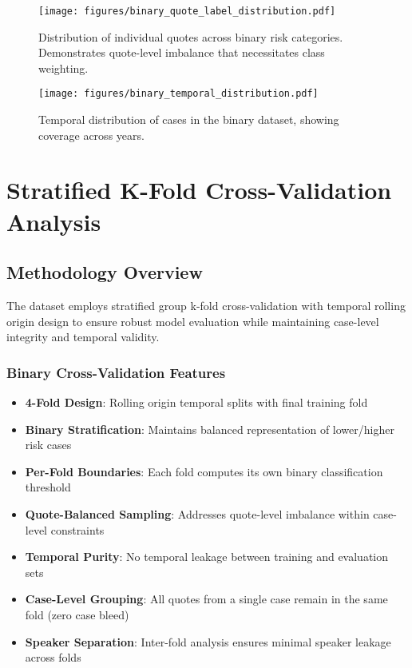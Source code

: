 \documentclass[11pt,a4paper]{article}
\begin{document}
\begin{figure}[H]
\centering
\texttt{[image: figures/binary\_quote\_label\_distribution.pdf]}
\caption{Distribution of individual quotes across binary risk categories. Demonstrates quote-level imbalance that necessitates class weighting.}
\end{figure}

\begin{figure}[H]
\centering
\texttt{[image: figures/binary\_temporal\_distribution.pdf]}
\caption{Temporal distribution of cases in the binary dataset, showing coverage across years.}
\end{figure}



\section{Stratified K-Fold Cross-Validation Analysis}

\subsection{Methodology Overview}

The dataset employs stratified group k-fold cross-validation with temporal rolling origin design to ensure robust model evaluation while maintaining case-level integrity and temporal validity.

\subsubsection{Binary Cross-Validation Features}
\begin{itemize}
\item \textbf{4-Fold Design}: Rolling origin temporal splits with final training fold
\item \textbf{Binary Stratification}: Maintains balanced representation of lower/higher risk cases
\item \textbf{Per-Fold Boundaries}: Each fold computes its own binary classification threshold
\item \textbf{Quote-Balanced Sampling}: Addresses quote-level imbalance within case-level constraints
\item \textbf{Temporal Purity}: No temporal leakage between training and evaluation sets
\item \textbf{Case-Level Grouping}: All quotes from a single case remain in the same fold (zero case bleed)
\item \textbf{Speaker Separation}: Inter-fold analysis ensures minimal speaker leakage across folds
\end{itemize}
\end{document}
